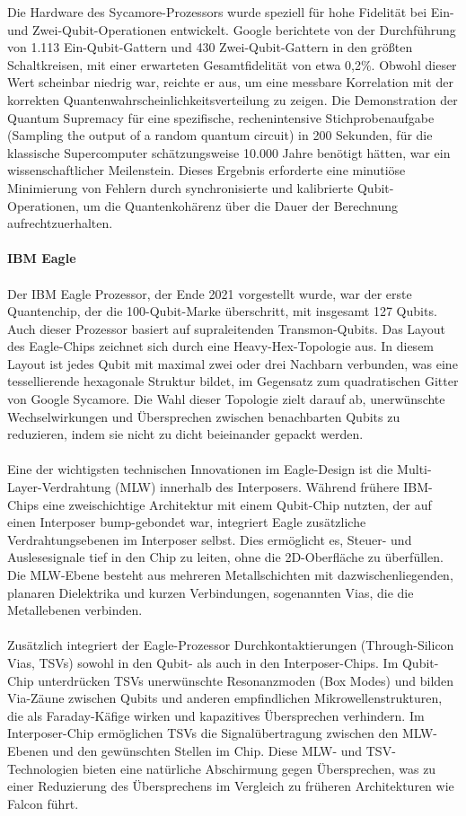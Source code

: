 Die Hardware des Sycamore-Prozessors wurde speziell für hohe Fidelität bei Ein- und Zwei-Qubit-Operationen entwickelt. Google berichtete von der Durchführung von 1.113 Ein-Qubit-Gattern und 430 Zwei-Qubit-Gattern in den größten Schaltkreisen, mit einer erwarteten Gesamtfidelität von etwa 0,2\%. Obwohl dieser Wert scheinbar niedrig war, reichte er aus, um eine messbare Korrelation mit der korrekten Quantenwahrscheinlichkeitsverteilung zu zeigen. Die Demonstration der \grqq Quantum Supremacy\grqq{} für eine spezifische, rechenintensive Stichprobenaufgabe (Sampling the output of a random quantum circuit) in 200 Sekunden, für die klassische Supercomputer schätzungsweise 10.000 Jahre benötigt hätten, war ein wissenschaftlicher Meilenstein. Dieses Ergebnis erforderte eine minutiöse Minimierung von Fehlern durch synchronisierte und kalibrierte Qubit-Operationen, um die Quantenkohärenz über die Dauer der Berechnung aufrechtzuerhalten.
\\\\
\textbf{IBM Eagle}\\\\
Der IBM Eagle Prozessor, der Ende 2021 vorgestellt wurde, war der erste Quantenchip, der die 100-Qubit-Marke überschritt, mit insgesamt 127 Qubits. Auch dieser Prozessor basiert auf supraleitenden Transmon-Qubits. Das Layout des Eagle-Chips zeichnet sich durch eine \grqq Heavy-Hex\grqq{}-Topologie aus. In diesem Layout ist jedes Qubit mit maximal zwei oder drei Nachbarn verbunden, was eine tessellierende hexagonale Struktur bildet, im Gegensatz zum quadratischen Gitter von Google Sycamore. Die Wahl dieser Topologie zielt darauf ab, unerwünschte Wechselwirkungen und Übersprechen zwischen benachbarten Qubits zu reduzieren, indem sie nicht zu dicht beieinander gepackt werden.\\\\
Eine der wichtigsten technischen Innovationen im Eagle-Design ist die Multi-Layer-Verdrahtung (MLW) innerhalb des Interposers. Während frühere IBM-Chips eine zweischichtige Architektur mit einem Qubit-Chip nutzten, der auf einen Interposer bump-gebondet war, integriert Eagle zusätzliche Verdrahtungsebenen im Interposer selbst. Dies ermöglicht es, Steuer- und Auslesesignale tief in den Chip zu leiten, ohne die 2D-Oberfläche zu überfüllen. Die MLW-Ebene besteht aus mehreren Metallschichten mit dazwischenliegenden, planaren Dielektrika und kurzen Verbindungen, sogenannten Vias, die die Metallebenen verbinden.\\\\ 
Zusätzlich integriert der Eagle-Prozessor Durchkontaktierungen (Through-Silicon Vias, TSVs) sowohl in den Qubit- als auch in den Interposer-Chips. Im Qubit-Chip unterdrücken TSVs unerwünschte Resonanzmoden (\grqq Box Modes\grqq{}) und bilden \grqq Via-Zäune\grqq{} zwischen Qubits und anderen empfindlichen Mikrowellenstrukturen, die als Faraday-Käfige wirken und kapazitives Übersprechen verhindern. Im Interposer-Chip ermöglichen TSVs die Signalübertragung zwischen den MLW-Ebenen und den gewünschten Stellen im Chip. Diese MLW- und TSV-Technologien bieten eine natürliche Abschirmung gegen Übersprechen, was zu einer Reduzierung des Übersprechens im Vergleich zu früheren Architekturen wie Falcon führt.\\\\

